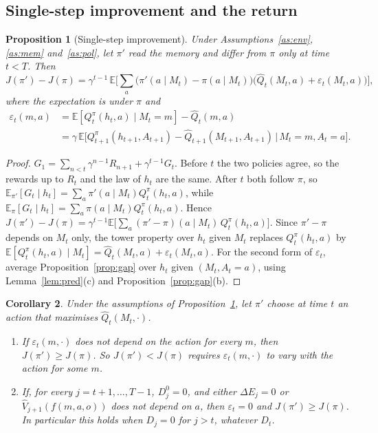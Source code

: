 \documentclass{article}
\newtheorem{proposition}{Proposition}[section]
\newtheorem{corollary}[proposition]{Corollary}
\theoremstyle{definition}
\theoremstyle{remark}
\newcommand{\E}{\mathbb{E}}
\newcommand{\dE}{\Delta E}
\begin{document}
\subsection{Single-step improvement and the return}

\begin{proposition}[Single-step improvement]\label{prop:improve}
Under Assumptions~\ref{as:env}, \ref{as:mem} and~\ref{as:pol}, let $\pi'$ read the memory and differ from $\pi$ only at time $t<T$. Then
\[
J(\pi')-J(\pi)=\gamma^{t-1}\,\E\Big[\sum_a\big(\pi'(a\mid M_t)-\pi(a\mid M_t)\big)\big(\hat Q_t(M_t,a)+\varepsilon_t(M_t,a)\big)\Big],
\]
where the expectation is under $\pi$ and
\begin{align*}
\varepsilon_t(m,a)&=\E[Q^\pi_t(h_t,a)\mid M_t=m]-\hat Q_t(m,a)\\
&=\gamma\,\E\big[Q^\pi_{t+1}(h_{t+1},A_{t+1})-\hat Q_{t+1}(M_{t+1},A_{t+1})\,\big|\,M_t=m,A_t=a\big].
\end{align*}
\end{proposition}

\begin{proof}
$G_1=\sum_{n<t}\gamma^{n-1}R_{n+1}+\gamma^{t-1}G_t$. Before $t$ the two policies agree, so the rewards up to $R_t$ and the law of $h_t$ are the same. After $t$ both follow $\pi$, so $\E_{\pi'}[G_t\mid h_t]=\sum_a\pi'(a\mid M_t)Q^\pi_t(h_t,a)$, while $\E_\pi[G_t\mid h_t]=\sum_a\pi(a\mid M_t)Q^\pi_t(h_t,a)$. Hence $J(\pi')-J(\pi)=\gamma^{t-1}\E\big[\sum_a(\pi'-\pi)(a\mid M_t)\,Q^\pi_t(h_t,a)\big]$. Since $\pi'-\pi$ depends on $M_t$ only, the tower property over $h_t$ given $M_t$ replaces $Q^\pi_t(h_t,a)$ by $\E[Q^\pi_t(h_t,a)\mid M_t]=\hat Q_t(M_t,a)+\varepsilon_t(M_t,a)$. For the second form of $\varepsilon_t$, average Proposition~\ref{prop:gap} over $h_t$ given $(M_t,A_t=a)$, using Lemma~\ref{lem:pred}(c) and Proposition~\ref{prop:gap}(b).
\end{proof}

\begin{corollary}\label{cor:improve}
Under the assumptions of Proposition~\ref{prop:improve}, let $\pi'$ choose at time $t$ an action that maximises $\hat Q_t(M_t,\cdot)$.
\begin{enumerate}
\item[(a)] If $\varepsilon_t(m,\cdot)$ does not depend on the action for every $m$, then $J(\pi')\ge J(\pi)$. So $J(\pi')<J(\pi)$ requires $\varepsilon_t(m,\cdot)$ to vary with the action for some $m$.
\item[(b)] If, for every $j=t+1,\dots,T-1$, $D^0_j=0$, and either $\dE_j=0$ or $\hat V_{j+1}(f(m,a,o))$ does not depend on $a$, then $\varepsilon_t=0$ and $J(\pi')\ge J(\pi)$. In particular this holds when $D_j=0$ for $j>t$, whatever $D_t$.
\end{enumerate}
\end{corollary}
\end{document}
